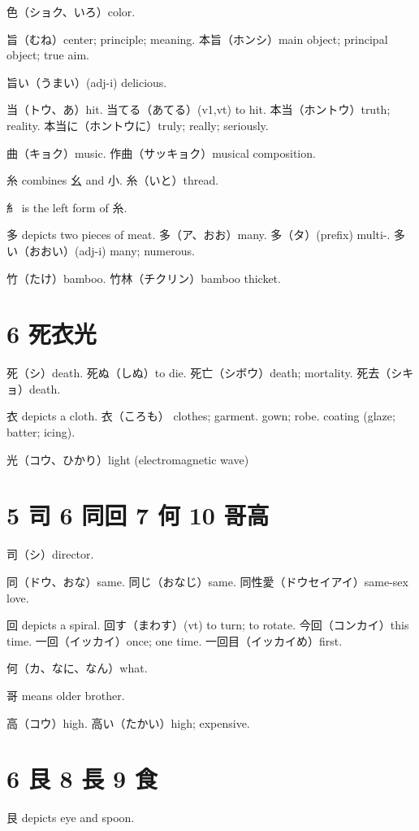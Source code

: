 色（ショク、いろ）color.

旨（むね）center; principle; meaning.
本旨（ホンシ）main object; principal object; true aim.

旨い（うまい）(adj-i) delicious.

当（トウ、あ）hit.
当てる（あてる）(v1,vt) to hit.
本当（ホントウ）truth; reality.
本当に（ホントウに）truly; really; seriously.

曲（キョク）music.
作曲（サッキョク）musical composition.

糸 combines 幺 and 小.
糸（いと）thread.

糹 is the left form of 糸.

多 depicts two pieces of meat.
多（ア、おお）many.
多（タ）(prefix) multi-.
多い（おおい）(adj-i) many; numerous.

竹（たけ）bamboo.
竹林（チクリン）bamboo thicket.

\section{6 死衣光}

死（シ）death.
死ぬ（しぬ）to die.
死亡（シボウ）death; mortality.
死去（シキョ）death.

衣 depicts a cloth.
衣（ころも）
clothes;
garment. gown;
robe. coating (glaze; batter; icing).

光（コウ、ひかり）light (electromagnetic wave)

\section{5 司 6 同回 7 何 10 哥高}

司（シ）director.

同（ドウ、おな）same.
同じ（おなじ）same.
同性愛（ドウセイアイ）same-sex love.

回 depicts a spiral.
回す（まわす）(vt) to turn; to rotate.
今回（コンカイ）this time.
一回（イッカイ）once; one time.
一回目（イッカイめ）first.

何（カ、なに、なん）what.

哥 means older brother.

高（コウ）high.
高い（たかい）high; expensive.

\section{6 艮 8 長 9 食}

艮 depicts eye and spoon.

